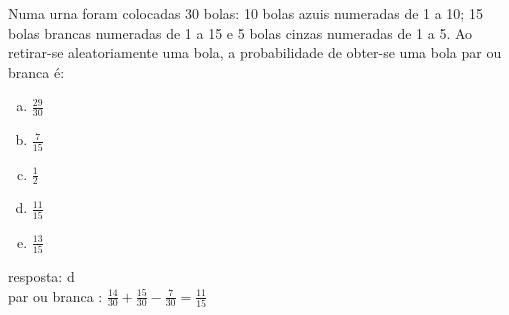 \begin{ex}
 Numa urna foram colocadas 30 bolas: 10 bolas azuis numeradas de 1 a 10; 15 bolas brancas numeradas de 1 a 15 e 5 bolas cinzas numeradas de 1 a 5. Ao retirar-se aleatoriamente uma bola, a probabilidade de obter-se uma bola par ou branca é:
    \begin{enumerate}[(a)]
    \item $\frac{29}{30}$
    \item $\frac{7}{15}$
    \item $\frac{1}{2}$
    \item $\frac{11}{15}$
    \item $\frac{13}{15}$
    \end{enumerate}
      \begin{sol}
      resposta: d\\
       par ou branca : $\frac{14}{30}+\frac{15}{30}-\frac{7}{30}=\frac{11}{15}$
      \end{sol}
\end{ex}